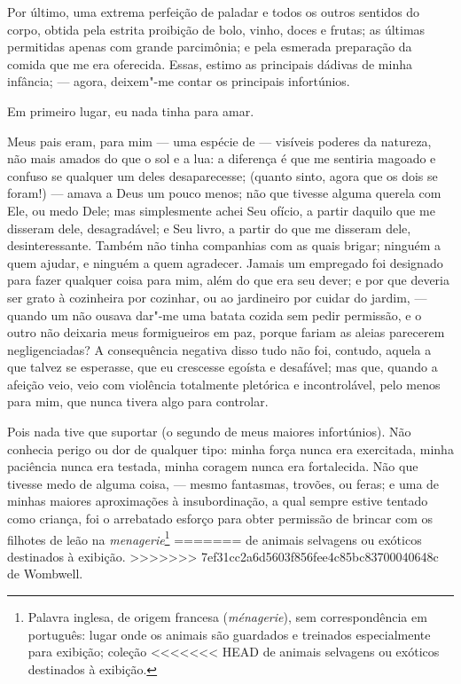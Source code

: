 {{{{{{{{{{{{{{{Por último, uma extrema perfeição de paladar e todos os outros sentidos
do corpo, obtida pela estrita proibição de bolo, vinho, doces e frutas;
as últimas permitidas apenas com grande parcimônia; e pela esmerada
preparação da comida que me era oferecida. Essas, estimo as principais
dádivas de minha infância; --- agora, deixem"-me contar os principais
infortúnios.

Em primeiro lugar, eu nada tinha para amar.

Meus pais eram, para mim --- uma espécie de --- visíveis poderes da
natureza, não mais amados do que o sol e a lua: a diferença é que me
sentiria magoado e confuso se qualquer um deles desaparecesse; (quanto
sinto, agora que os dois se foram!) --- amava a Deus um pouco menos; não
que tivesse alguma querela com Ele, ou medo Dele; mas simplesmente achei
Seu ofício, a partir daquilo que me disseram dele, desagradável; e Seu
livro, a partir do que me disseram dele, desinteressante. Também não
tinha companhias com as quais brigar; ninguém a quem ajudar, e ninguém a
quem agradecer. Jamais um empregado foi designado para fazer qualquer
coisa para mim, além do que era seu dever; e por que deveria ser grato à
cozinheira por cozinhar, ou ao jardineiro por cuidar do jardim, ---
quando um não ousava dar"-me uma batata cozida sem pedir permissão, e o
outro não deixaria meus formigueiros em paz, porque fariam as aleias
parecerem negligenciadas? A consequência negativa disso tudo não foi,
contudo, aquela a que talvez se esperasse, que eu crescesse egoísta e
desafável; mas que, quando a afeição veio, veio com violência totalmente
pletórica e incontrolável, pelo menos para mim, que nunca tivera algo
para controlar.

Pois nada tive que suportar (o segundo de meus maiores infortúnios).
Não conhecia perigo ou dor de qualquer tipo: minha força nunca era
exercitada, minha paciência nunca era testada, minha coragem nunca era
fortalecida. Não que tivesse medo de alguma coisa, --- mesmo fantasmas,
trovões, ou feras; e uma de minhas maiores aproximações à
insubordinação, a qual sempre estive tentado como criança, foi o
arrebatado esforço para obter permissão de brincar com os filhotes de
leão na \textit{menagerie}\footnote{Palavra inglesa, de origem francesa
  (\textit{ménagerie}), sem correspondência em português: lugar onde os
  animais são guardados e treinados especialmente para exibição; coleção
<<<<<<< HEAD
  de animais selvagens ou exóticos destinados à exibição.}
=======
  de animais selvagens ou exóticos destinados à exibição. 
>>>>>>> 7ef31cc2a6d5603f856fee4c85bc83700040648c
de Wombwell.

}}}}}}}}}}}}}}}
